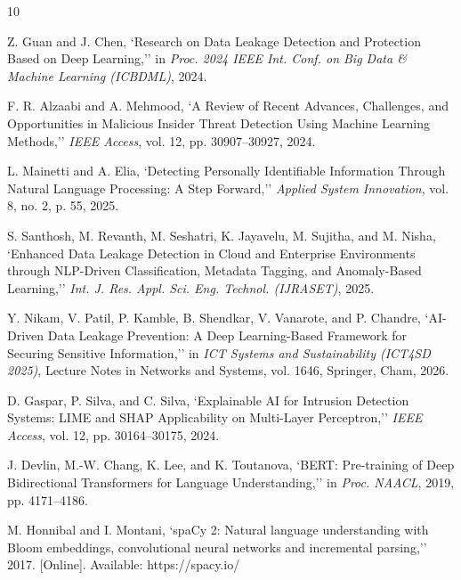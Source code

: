 ﻿\newpage
{}
\begin{thebibliography}{10}

Z. Guan and J. Chen, `Research on Data Leakage Detection and Protection Based on Deep Learning,'' in \emph{Proc. 2024 IEEE Int. Conf. on Big Data \& Machine Learning (ICBDML)}, 2024.

F. R. Alzaabi and A. Mehmood, `A Review of Recent Advances, Challenges, and Opportunities in Malicious Insider Threat Detection Using Machine Learning Methods,'' \emph{IEEE Access}, vol. 12, pp. 30907--30927, 2024.

L. Mainetti and A. Elia, `Detecting Personally Identifiable Information Through Natural Language Processing: A Step Forward,'' \emph{Applied System Innovation}, vol. 8, no. 2, p. 55, 2025.

S. Santhosh, M. Revanth, M. Seshatri, K. Jayavelu, M. Sujitha, and M. Nisha, `Enhanced Data Leakage Detection in Cloud and Enterprise Environments through NLP-Driven Classification, Metadata Tagging, and Anomaly-Based Learning,'' \emph{Int. J. Res. Appl. Sci. Eng. Technol. (IJRASET)}, 2025.

Y. Nikam, V. Patil, P. Kamble, B. Shendkar, V. Vanarote, and P. Chandre, `AI-Driven Data Leakage Prevention: A Deep Learning-Based Framework for Securing Sensitive Information,'' in \emph{ICT Systems and Sustainability (ICT4SD 2025)}, Lecture Notes in Networks and Systems, vol. 1646, Springer, Cham, 2026.

D. Gaspar, P. Silva, and C. Silva, `Explainable AI for Intrusion Detection Systems: LIME and SHAP Applicability on Multi-Layer Perceptron,'' \emph{IEEE Access}, vol. 12, pp. 30164--30175, 2024.

J. Devlin, M.-W. Chang, K. Lee, and K. Toutanova, `BERT: Pre-training of Deep Bidirectional Transformers for Language Understanding,'' in \emph{Proc. NAACL}, 2019, pp. 4171--4186.

M. Honnibal and I. Montani, `spaCy 2: Natural language understanding with Bloom embeddings, convolutional neural networks and incremental parsing,'' 2017. [Online]. Available: https://spacy.io/

\end{thebibliography}
